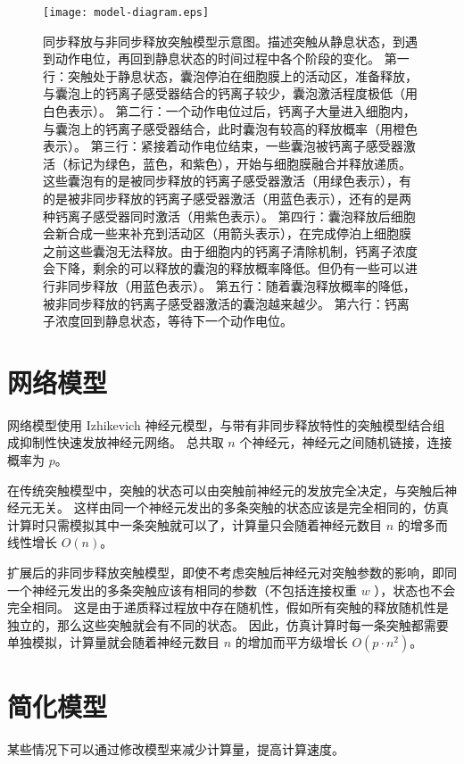 \begin{figure}
\centering
\texttt{[image: model-diagram.eps]}
\caption{同步释放与非同步释放突触模型示意图。描述突触从静息状态，到遇到动作电位，再回到静息状态的时间过程中各个阶段的变化。
第一行：突触处于静息状态，囊泡停泊在细胞膜上的活动区，准备释放，与囊泡上的钙离子感受器结合的钙离子较少，囊泡激活程度极低（用白色表示）。
第二行：一个动作电位过后，钙离子大量进入细胞内，与囊泡上的钙离子感受器结合，此时囊泡有较高的释放概率（用橙色表示）。
第三行：紧接着动作电位结束，一些囊泡被钙离子感受器激活（标记为绿色，蓝色，和紫色），开始与细胞膜融合并释放递质。这些囊泡有的是被同步释放的钙离子感受器激活（用绿色表示），有的是被非同步释放的钙离子感受器激活（用蓝色表示），还有的是两种钙离子感受器同时激活（用紫色表示）。
第四行：囊泡释放后细胞会新合成一些来补充到活动区（用箭头表示），在完成停泊上细胞膜之前这些囊泡无法释放。由于细胞内的钙离子清除机制，钙离子浓度会下降，剩余的可以释放的囊泡的释放概率降低。但仍有一些可以进行非同步释放（用蓝色表示）。
第五行：随着囊泡释放概率的降低，被非同步释放的钙离子感受器激活的囊泡越来越少。
第六行：钙离子浓度回到静息状态，等待下一个动作电位。}
\label{figure:model-diagram}
\end{figure}

\section{网络模型}
\label{section:model:network-model}
网络模型使用 Izhikevich 神经元模型，与带有非同步释放特性的突触模型结合组成抑制性快速发放神经元网络。
总共取 $n$ 个神经元，神经元之间随机链接，连接概率为 $p$。

在传统突触模型中，突触的状态可以由突触前神经元的发放完全决定，与突触后神经元无关。
这样由同一个神经元发出的多条突触的状态应该是完全相同的，仿真计算时只需模拟其中一条突触就可以了，计算量只会随着神经元数目 $n$ 的增多而线性增长 $O(n)$。

扩展后的非同步释放突触模型，即使不考虑突触后神经元对突触参数的影响，即同一个神经元发出的多条突触应该有相同的参数（不包括连接权重 $w$ ），状态也不会完全相同。
这是由于递质释过程放中存在随机性，假如所有突触的释放随机性是独立的，那么这些突触就会有不同的状态。
因此，仿真计算时每一条突触都需要单独模拟，计算量就会随着神经元数目 $n$ 的增加而平方级增长 $O(p \cdot n^2)$。


\section{简化模型}
\label{section:model:simplified-model}
某些情况下可以通过修改模型来减少计算量，提高计算速度。

